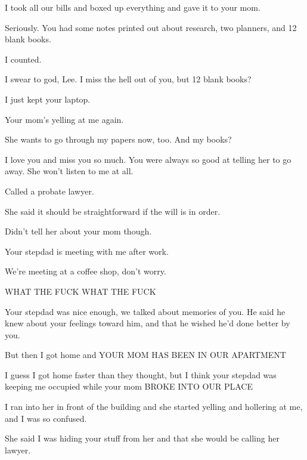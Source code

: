 { I took all our bills and boxed up everything and gave it to your mom.

 Seriously. You had some notes printed out about research, two planners, and 12 blank books.

 I counted.

 I swear to god, Lee. I miss the hell out of you, but 12 blank books?

 I just kept your laptop.

\nopagebreak

 Your mom's yelling at me again.

 She wants to go through my papers now, too. And my books?

 I love you and miss you so much. You were always so good at telling her to go away. She won't listen to me at all.

 Called a probate lawyer.

 She said it should be straightforward if the will is in order.

 Didn't tell her about your mom though.

\nopagebreak

 Your stepdad is meeting with me after work.

 We're meeting at a coffee shop, don't worry.

 WHAT THE FUCK WHAT THE FUCK

 Your stepdad was nice enough, we talked about memories of you. He said he knew about your feelings toward him, and that he wished he'd done better by you.

 But then I got home and YOUR MOM HAS BEEN IN OUR APARTMENT

 I guess I got home faster than they thought, but I think your stepdad was keeping me occupied while your mom BROKE INTO OUR PLACE

 I ran into her in front of the building and she started yelling and hollering at me, and I was so confused.

 She said I was hiding your stuff from her and that she would be calling her lawyer.

}
